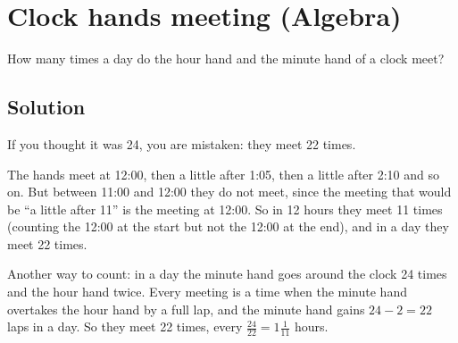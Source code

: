 \section {Clock hands meeting (Algebra)}

How many times a day do the hour hand and the minute hand of a clock meet?

\subsection{Solution}

If you thought it was 24, you are mistaken: they meet 22 times.

The hands meet at 12:00, then a little after 1:05, then a little after 2:10 and so on.
But between 11:00 and 12:00 they do not meet, since the meeting that would be ``a little after 11'' is the meeting at 12:00.
So in 12 hours they meet 11 times (counting the 12:00 at the start but not the 12:00 at the end), and in a day they meet 22 times.

Another way to count: in a day the minute hand goes around the clock 24 times and the hour hand twice.
Every meeting is a time when the minute hand overtakes the hour hand by a full lap, and the minute hand gains $24-2=22$ laps in a day.
So they meet 22 times, every $\frac{24}{22} = 1\frac{1}{11}$ hours.
